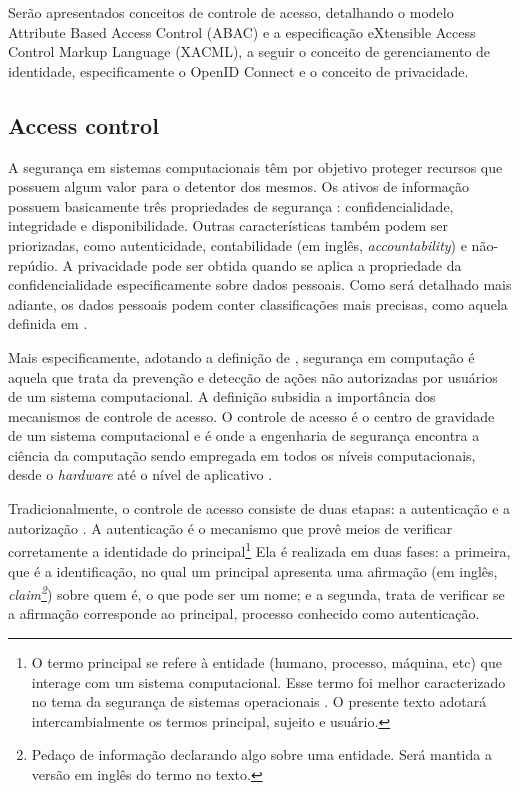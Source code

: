 \documentclass{doublecol-new}
\begin{document}
Serão apresentados conceitos de controle de acesso, detalhando o modelo Attribute Based Access Control (ABAC)\cite{huABAC2014guide} e a especificação eXtensible Access Control Markup Language (XACML)\cite{rissanen2013extensible}, a seguir o conceito de gerenciamento de identidade, especificamente o OpenID Connect e o conceito de privacidade.


\subsection{Access control}
A segurança em sistemas computacionais têm por objetivo proteger recursos que possuem algum valor para o detentor dos mesmos. Os ativos de informação possuem basicamente três propriedades de segurança \cite{gollmann2011compsecurity}: confidencialidade, integridade e disponibilidade. Outras características também podem ser priorizadas, como autenticidade, contabilidade (em inglês, \textit{accountability}) e não-repúdio. A privacidade pode ser obtida quando se aplica a propriedade da confidencialidade especificamente sobre dados pessoais. Como será detalhado mais adiante, os dados pessoais podem conter classificações mais precisas, como aquela definida em \cite{heurix2015taxonomy}.

Mais especificamente, adotando a definição de  \cite{gollmann2011compsecurity}, segurança em computação é aquela que trata da prevenção e detecção de ações não autorizadas por usuários de um sistema computacional. A definição subsidia a importância dos mecanismos de controle de acesso. O controle de acesso é o centro de gravidade de um sistema computacional e é onde a engenharia de segurança encontra a ciência da computação sendo empregada em todos os níveis computacionais, desde o \textit{hardware} até o nível de aplicativo \cite{anderson2008security}.

Tradicionalmente, o controle de acesso consiste de duas etapas: a autenticação e a autorização \cite{gollmann2011compsecurity}. A autenticação é o mecanismo que provê meios de verificar corretamente a identidade do principal\footnote{O termo principal se refere à entidade (humano, processo, máquina, etc) que interage com um sistema computacional. Esse termo foi melhor caracterizado no tema da segurança de sistemas operacionais \cite{gollmann2011compsecurity}. O presente texto adotará intercambialmente os termos principal, sujeito e usuário.} Ela é realizada em duas fases: a primeira, que é a identificação, no qual um principal apresenta uma afirmação (em inglês, \textit{claim\footnote{Pedaço de informação declarando algo sobre uma entidade. Será mantida a versão em inglês do termo no texto.}}) sobre quem é, o que pode ser um nome; e a segunda, trata de verificar se a afirmação corresponde ao principal, processo conhecido como autenticação. 
\end{document}
